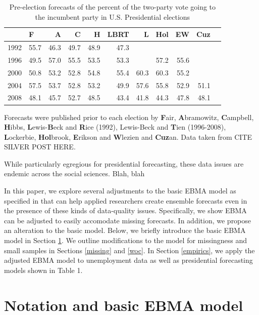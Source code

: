 \documentclass[12pt,fullpage,endnotes]{article}
\begin{document}
\begin{table}[ht]
\caption{Pre-election forecasts of the percent of the two-party vote going to the incumbent party in U.S. Presidential elections}
\footnotesize
\begin{center}
\begin{tabular}{rlrrrrrrrrr}
  \toprule
  & F & A & C & H & LBRT & L & Hol & EW & Cuz \\ 
  \midrule
  1992 & 55.7 & 46.3 & 49.7 & 48.9 & 47.3 &  &  &  &  \\ 
  1996 & 49.5 & 57.0 & 55.5 & 53.5 & 53.3 &  & 57.2 & 55.6 &  \\ 
  2000 & 50.8 & 53.2 & 52.8 & 54.8 & 55.4 & 60.3 & 60.3 & 55.2 &  \\ 
  2004 & 57.5 & 53.7 & 52.8 & 53.2 & 49.9 & 57.6 & 55.8 & 52.9 & 51.1 \\ 
  2008 & 48.1 & 45.7 & 52.7 & 48.5 & 43.4 & 41.8 & 44.3 & 47.8 & 48.1 \\ 
  \bottomrule

\end{tabular}
\end{center}
Forecasts were published prior to each election by \textbf{F}air, \textbf{A}bramowitz, \textbf{C}ampbell, \textbf{H}ibbs, \textbf{L}ewis-\textbf{B}eck and \textbf{R}ice (1992), Lewis-Beck and \textbf{T}ien  (1996-2008),   \textbf{L}ockerbie, \textbf{Hol}brook, \textbf{E}rikson and \textbf{W}lezien and \textbf{Cuz}an.  Data taken from CITE SILVER POST HERE.
\end{table}

While particularly egregious for presidential forecasting, these data
issues are endemic across the social sciences.  Blah, blah

In this paper, we explore several adjustments to the basic EBMA model
as specified in \citet{Montgomery:2012} that can help applied
researchers create ensemble forecasts even in the presence of these
kinds of data-quality issues.  Specifically, we show EBMA can be
adjusted to easily accomodate missing forecasts.  In addition, we
propose an alteration to the basic model.  Below, we briefly introduce
the basic EBMA model in Section \ref{model}.  We outline modifications
to the model for missingness and small samples in Sections
\ref{missing} and \ref{woc}. In Section \ref{empirics}, we apply the
adjusted EBMA model to unemployment data as well as presidential
forecasting models shown in Table 1.


\section{Notation and basic EBMA model} 
\label{model}
\end{document}
